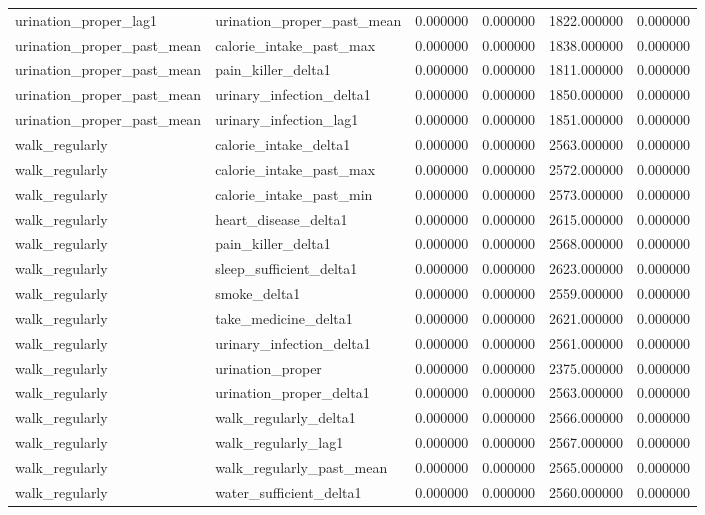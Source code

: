 \begin{longtable}{llrrrr}
urination\_proper\_lag1 & urination\_proper\_past\_mean & 0.000000 & 0.000000 & 1822.000000 & 0.000000 \\
urination\_proper\_past\_mean & calorie\_intake\_past\_max & 0.000000 & 0.000000 & 1838.000000 & 0.000000 \\
urination\_proper\_past\_mean & pain\_killer\_delta1 & 0.000000 & 0.000000 & 1811.000000 & 0.000000 \\
urination\_proper\_past\_mean & urinary\_infection\_delta1 & 0.000000 & 0.000000 & 1850.000000 & 0.000000 \\
urination\_proper\_past\_mean & urinary\_infection\_lag1 & 0.000000 & 0.000000 & 1851.000000 & 0.000000 \\
walk\_regularly & calorie\_intake\_delta1 & 0.000000 & 0.000000 & 2563.000000 & 0.000000 \\
walk\_regularly & calorie\_intake\_past\_max & 0.000000 & 0.000000 & 2572.000000 & 0.000000 \\
walk\_regularly & calorie\_intake\_past\_min & 0.000000 & 0.000000 & 2573.000000 & 0.000000 \\
walk\_regularly & heart\_disease\_delta1 & 0.000000 & 0.000000 & 2615.000000 & 0.000000 \\
walk\_regularly & pain\_killer\_delta1 & 0.000000 & 0.000000 & 2568.000000 & 0.000000 \\
walk\_regularly & sleep\_sufficient\_delta1 & 0.000000 & 0.000000 & 2623.000000 & 0.000000 \\
walk\_regularly & smoke\_delta1 & 0.000000 & 0.000000 & 2559.000000 & 0.000000 \\
walk\_regularly & take\_medicine\_delta1 & 0.000000 & 0.000000 & 2621.000000 & 0.000000 \\
walk\_regularly & urinary\_infection\_delta1 & 0.000000 & 0.000000 & 2561.000000 & 0.000000 \\
walk\_regularly & urination\_proper & 0.000000 & 0.000000 & 2375.000000 & 0.000000 \\
walk\_regularly & urination\_proper\_delta1 & 0.000000 & 0.000000 & 2563.000000 & 0.000000 \\
walk\_regularly & walk\_regularly\_delta1 & 0.000000 & 0.000000 & 2566.000000 & 0.000000 \\
walk\_regularly & walk\_regularly\_lag1 & 0.000000 & 0.000000 & 2567.000000 & 0.000000 \\
walk\_regularly & walk\_regularly\_past\_mean & 0.000000 & 0.000000 & 2565.000000 & 0.000000 \\
walk\_regularly & water\_sufficient\_delta1 & 0.000000 & 0.000000 & 2560.000000 & 0.000000 \\

\end{longtable}
